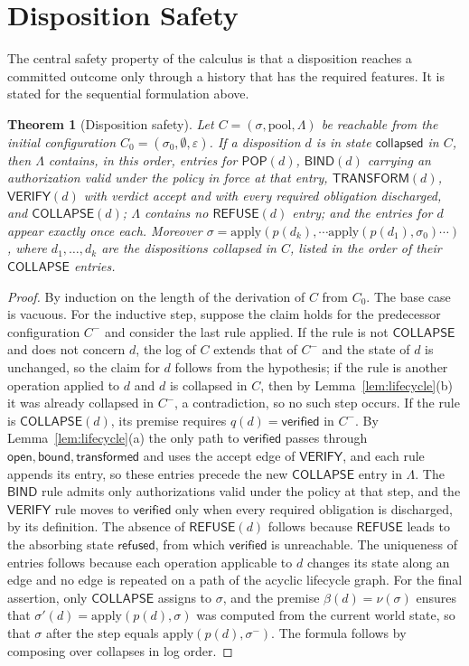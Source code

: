 \documentclass[11pt,twoside,openright]{book}
\theoremstyle{plain}
\newtheorem{theorem}{Theorem}[chapter]
\theoremstyle{definition}
\theoremstyle{remark}
\newcommand{\pop}{\mathsf{POP}}
\newcommand{\refuse}{\mathsf{REFUSE}}
\newcommand{\bind}{\mathsf{BIND}}
\newcommand{\transform}{\mathsf{TRANSFORM}}
\newcommand{\verify}{\mathsf{VERIFY}}
\newcommand{\collapse}{\mathsf{COLLAPSE}}
\begin{document}
\section{Disposition Safety}

The central safety property of the calculus is that a disposition reaches a committed outcome only through a history that has the required features. It is stated for the sequential formulation above.

\begin{theorem}[Disposition safety]\label{thm:safety}
Let $C=(\sigma,\text{pool},\Lambda)$ be reachable from the initial configuration $C_0=(\sigma_0,\emptyset,\varepsilon)$. If a disposition $d$ is in state $\mathsf{collapsed}$ in $C$, then $\Lambda$ contains, in this order, entries for $\pop(d)$, $\bind(d)$ carrying an authorization valid under the policy in force at that entry, $\transform(d)$, $\verify(d)$ with verdict accept and with every required obligation discharged, and $\collapse(d)$; $\Lambda$ contains no $\refuse(d)$ entry; and the entries for $d$ appear exactly once each. Moreover $\sigma=\mathrm{apply}(p(d_k),\cdots\mathrm{apply}(p(d_1),\sigma_0)\cdots)$, where $d_1,\dots,d_k$ are the dispositions collapsed in $C$, listed in the order of their $\collapse$ entries.
\end{theorem}

\begin{proof}
By induction on the length of the derivation of $C$ from $C_0$. The base case is vacuous. For the inductive step, suppose the claim holds for the predecessor configuration $C^-$ and consider the last rule applied. If the rule is not $\collapse$ and does not concern $d$, the log of $C$ extends that of $C^-$ and the state of $d$ is unchanged, so the claim for $d$ follows from the hypothesis; if the rule is another operation applied to $d$ and $d$ is collapsed in $C$, then by Lemma~\ref{lem:lifecycle}(b) it was already collapsed in $C^-$, a contradiction, so no such step occurs. If the rule is $\collapse(d)$, its premise requires $q(d)=\mathsf{verified}$ in $C^-$. By Lemma~\ref{lem:lifecycle}(a) the only path to $\mathsf{verified}$ passes through $\mathsf{open},\mathsf{bound},\mathsf{transformed}$ and uses the accept edge of $\verify$, and each rule appends its entry, so these entries precede the new $\collapse$ entry in $\Lambda$. The $\bind$ rule admits only authorizations valid under the policy at that step, and the $\verify$ rule moves to $\mathsf{verified}$ only when every required obligation is discharged, by its definition. The absence of $\refuse(d)$ follows because $\refuse$ leads to the absorbing state $\mathsf{refused}$, from which $\mathsf{verified}$ is unreachable. The uniqueness of entries follows because each operation applicable to $d$ changes its state along an edge and no edge is repeated on a path of the acyclic lifecycle graph. For the final assertion, only $\collapse$ assigns to $\sigma$, and the premise $\beta(d)=\nu(\sigma)$ ensures that $\sigma'(d)=\mathrm{apply}(p(d),\sigma)$ was computed from the current world state, so that $\sigma$ after the step equals $\mathrm{apply}(p(d),\sigma^-)$. The formula follows by composing over collapses in log order.
\end{proof}
\end{document}
